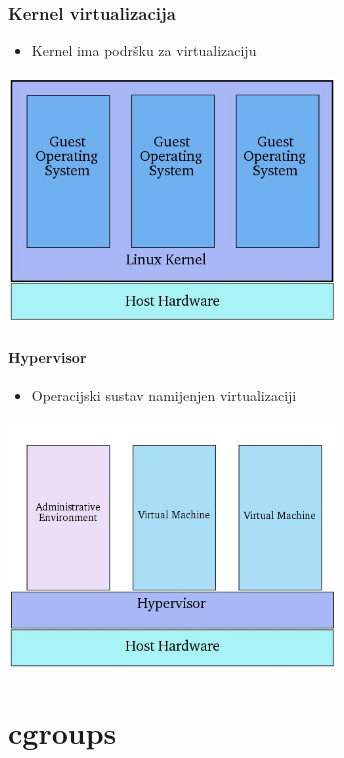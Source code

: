 \documentclass[t]{beamer}
\begin{document}
\begin{frame}
	\frametitle{Kernel virtualizacija}
	\centering
	\begin{itemize}
		\item Kernel ima podršku za virtualizaciju
	\end{itemize}
	\includegraphics[width=0.65\textwidth]{kernel_virt.jpg}
\end{frame}

\begin{frame}
	\framesubtitle{Hypervisor}
	\centering
	\begin{itemize}
		\item Operacijski sustav namijenjen virtualizaciji
	\end{itemize}
	\includegraphics[width=0.65\textwidth]{hypervisor_virt.jpg}
\end{frame}


\section{cgroups}
\end{document}
